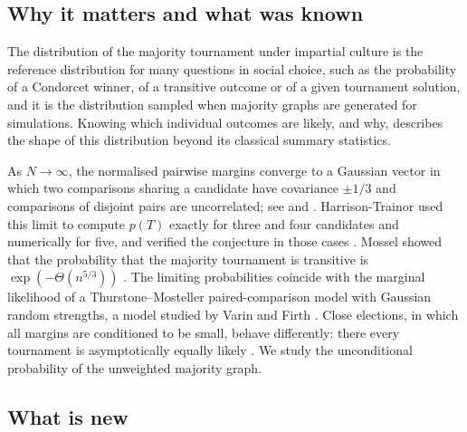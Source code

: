 \documentclass[11pt,a4paper]{article}
\theoremstyle{definition}
\begin{document}
\subsection{Why it matters and what was known}

The distribution of the majority tournament under impartial culture is the reference distribution for many questions in social choice, such as the probability of a Condorcet winner, of a transitive outcome or of a given tournament solution, and it is the distribution sampled when majority graphs are generated for simulations. Knowing which individual outcomes are likely, and why, describes the shape of this distribution beyond its classical summary statistics.

As $N\to\infty$, the normalised pairwise margins converge to a Gaussian vector in which two comparisons sharing a candidate have covariance $\pm1/3$ and comparisons of disjoint pairs are uncorrelated; see \cite{harrison} and \cite{close}. Harrison-Trainor used this limit to compute $p(T)$ exactly for three and four candidates and numerically for five, and verified the conjecture in those cases \cite{harrison}. Mossel showed that the probability that the majority tournament is transitive is $\exp(-\Theta(n^{5/3}))$ \cite[eq.~(6)]{Mossel2010}. The limiting probabilities coincide with the marginal likelihood of a Thurstone--Mosteller paired-comparison model with Gaussian random strengths, a model studied by Varin and Firth \cite{varin}. Close elections, in which all margins are conditioned to be small, behave differently: there every tournament is asymptotically equally likely \cite{close}. We study the unconditional probability of the unweighted majority graph.

\subsection{What is new}
\end{document}

